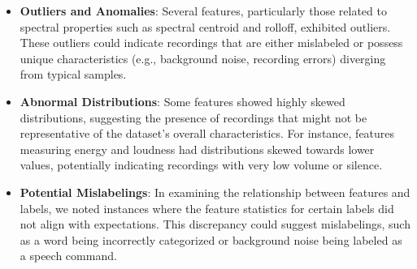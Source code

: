 \begin{itemize}
    \item \textbf{Outliers and Anomalies}: Several features, particularly those related to spectral properties such as spectral centroid and rolloff, exhibited outliers. These outliers could indicate recordings that are either mislabeled or possess unique characteristics (e.g., background noise, recording errors) diverging from typical samples.
    \item \textbf{Abnormal Distributions}: Some features showed highly skewed distributions, suggesting the presence of recordings that might not be representative of the dataset's overall characteristics. For instance, features measuring energy and loudness had distributions skewed towards lower values, potentially indicating recordings with very low volume or silence.
    \item \textbf{Potential Mislabelings}: In examining the relationship between features and labels, we noted instances where the feature statistics for certain labels did not align with expectations. This discrepancy could suggest mislabelings, such as a word being incorrectly categorized or background noise being labeled as a speech command.
\end{itemize}

